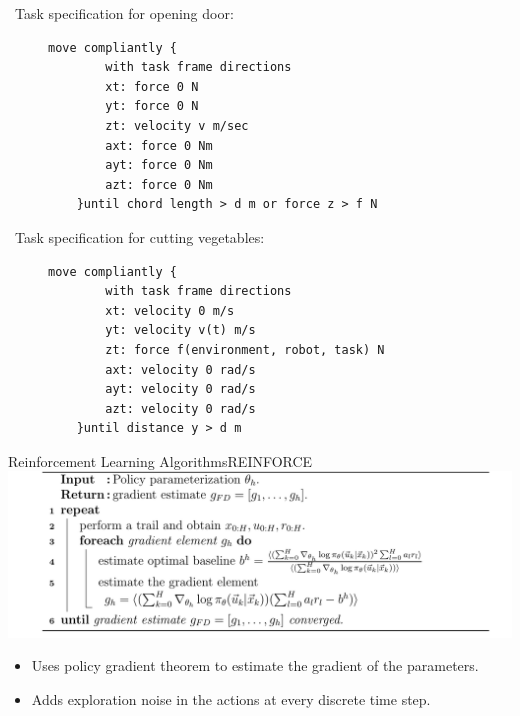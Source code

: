 \documentclass[aspectratio=169]{beamer}
\begin{document}
\begin{frame}[fragile]{~}{Task specification for opening door:}
	\begin{figure}
		\begin{lstlisting}[label=tff-open-door-a,caption=Task Specification using TFF: Open Door]
        move compliantly {
        with task frame directions
        xt: force 0 N
        yt: force 0 N
        zt: velocity v m/sec
        axt: force 0 Nm
        ayt: force 0 Nm
        azt: force 0 Nm
    }until chord length > d m or force z > f N \end{lstlisting}
	\end{figure}
\end{frame}

\begin{frame}[fragile]{~}{Task specification for cutting vegetables:}
	\begin{figure}
		\begin{lstlisting}[label=cut_vegies,caption=Cut vegetables]
        move compliantly {
        with task frame directions
        xt: velocity 0 m/s 
        yt: velocity v(t) m/s
        zt: force f(environment, robot, task) N
        axt: velocity 0 rad/s
        ayt: velocity 0 rad/s
        azt: velocity 0 rad/s
    }until distance y > d m \end{lstlisting}
	\end{figure}
\end{frame}

\begin{frame}{Reinforcement Learning Algorithms}{REINFORCE}
	\includegraphics[width=\textwidth]{images/reinforce}
	
	\begin{itemize}
		\small
		\item Uses policy gradient theorem to estimate the gradient of the parameters.
		\item Adds exploration noise in the actions at every discrete time step.
	\end{itemize}
\end{frame}
\end{document}
